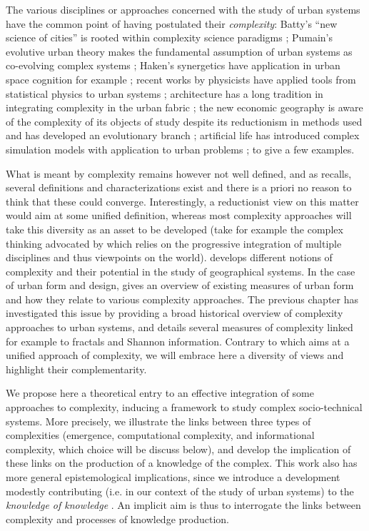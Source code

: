 The various disciplines or approaches concerned with the study of urban systems have the common point of having postulated their \emph{complexity}: Batty's ``new science of cities'' is rooted within complexity science paradigms \cite{batty2007cities,batty2013new}; Pumain's evolutive urban theory makes the fundamental assumption of urban systems as co-evolving complex systems \cite{pumain2017geography,pumain1997pour}; Haken's synergetics have application in urban space cognition for example \cite{e18060197}; recent works by physicists have applied tools from statistical physics to urban systems \cite{west2017scale}; architecture has a long tradition in integrating complexity in the urban fabric \cite{alexander1977pattern}; the new economic geography is aware of the complexity of its objects of study despite its reductionism in methods used \cite{krugman1994complex} and has developed an evolutionary branch \cite{cooke2018evolutionary}; artificial life has introduced complex simulation models with application to urban problems \cite{raimbault2014hybrid}; to give a few examples.

What is meant by complexity remains however not well defined, and as \cite{chu2008criteria} recalls, several definitions and characterizations exist and there is a priori no reason to think that these could converge. Interestingly, a reductionist view on this matter would aim at some unified definition, whereas most complexity approaches will take this diversity as an asset to be developed (take for example the complex thinking advocated by \cite{morin1991methode} which relies on the progressive integration of multiple disciplines and thus viewpoints on the world). \cite{manson2001simplifying} develops different notions of complexity and their potential in the study of geographical systems. In the case of urban form and design, \cite{Boeing2018} gives an overview of existing measures of urban form and how they relate to various complexity approaches. The previous chapter \cite{batty2018which} has investigated this issue by providing a broad historical overview of complexity approaches to urban systems, and details several measures of complexity linked for example to fractals and Shannon information. Contrary to \cite{Ladyman2013} which aims at a unified approach of complexity, we will embrace here a diversity of views and highlight their complementarity.


We propose here a theoretical entry to an effective integration of some approaches to complexity, inducing a framework to study complex socio-technical systems. More precisely, we illustrate the links between three types of complexities (emergence, computational complexity, and informational complexity, which choice will be discuss below), and develop the implication of these links on the production of a knowledge of the complex. This work also has more general epistemological implications, since we introduce a development modestly contributing (i.e. in our context of the study of urban systems) to the \emph{knowledge of knowledge} \cite{edgar1986methode}. An implicit aim is thus to interrogate the links between complexity and processes of knowledge production.


